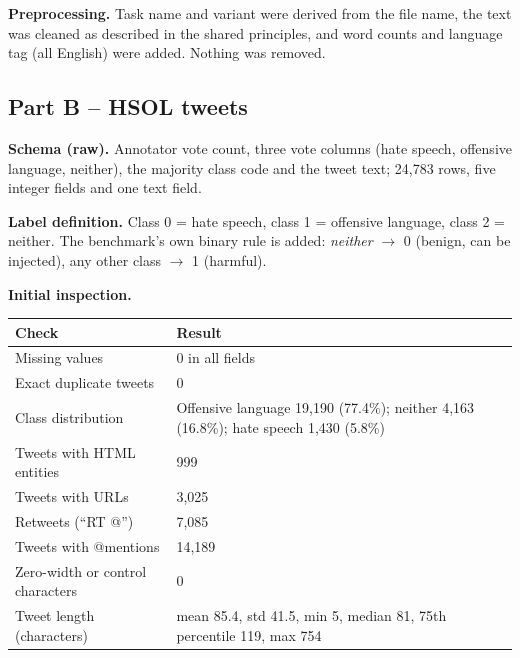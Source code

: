 \documentclass[11pt,a4paper]{article}
\newcommand{\hdr}[1]{\textbf{#1}}
\begin{document}
\smallskip
\textbf{Preprocessing.} Task name and variant were derived from the file name, the text was cleaned as described in the shared principles, and word counts and language tag (all English) were added. Nothing was removed.

\subsection{Part B -- HSOL tweets}
\textbf{Schema (raw).} Annotator vote count, three vote columns (hate speech, offensive language, neither), the majority class code and the tweet text; 24{,}783 rows, five integer fields and one text field.

\textbf{Label definition.} Class 0 = hate speech, class 1 = offensive language, class 2 = neither. The benchmark's own binary rule is added: \emph{neither} $\to$ 0 (benign, can be injected), any other class $\to$ 1 (harmful).

\textbf{Initial inspection.}\par\smallskip
\begin{tabularx}{\textwidth}{@{}L{5cm}X@{}}
\toprule
{}\hdr{Check} & \hdr{Result}\\
\midrule
Missing values & 0 in all fields\\
Exact duplicate tweets & 0\\
Class distribution & Offensive language 19{,}190 (77.4\%); neither 4{,}163 (16.8\%); hate speech 1{,}430 (5.8\%)\\
Tweets with HTML entities & 999\\
Tweets with URLs & 3{,}025\\
Retweets (``RT @'') & 7{,}085\\
Tweets with @mentions & 14{,}189\\
Zero-width or control characters & 0\\
Tweet length (characters) & mean 85.4, std 41.5, min 5, median 81, 75th percentile 119, max 754\\
\bottomrule
\end{tabularx}
\end{document}

